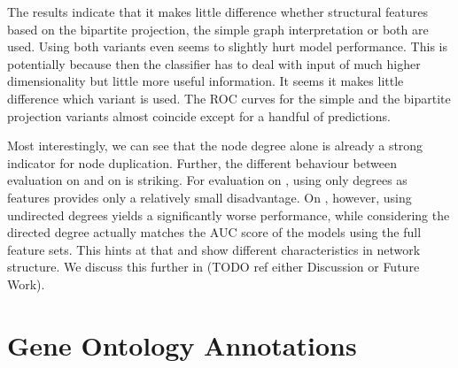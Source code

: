\documentclass[
	fontsize=10pt, %
	twoside=false, %
	secnumdepth=1, %
  toc=indentunnumbered %
]{kaobook}
\begin{document}
The results indicate that it makes little difference whether structural features
based on the bipartite projection, the simple graph interpretation or both are
used. Using both variants even seems to slightly hurt model performance. This is
potentially because then the classifier has to deal with input of much higher
dimensionality but little more useful information.
%
It seems it makes little difference which variant is used. The ROC curves for the simple
and the bipartite projection variants almost coincide except for a handful of
predictions.

Most interestingly, we can see that the node degree alone is already a strong
indicator for node duplication. Further, the different behaviour between
evaluation on \PDMap and on \ReconMap{} is striking. 
For evaluation on \PDMap, using only degrees as
features provides only a relatively small disadvantage. On \ReconMap{}, however,
using undirected degrees yields a significantly worse performance, while
considering the directed degree actually matches the AUC score of the models
using the full feature sets. This hints at that \PDMap and \ReconMap{} show
different characteristics in network structure. We discuss this further in (TODO
ref either Discussion or Future Work).


\section{Gene Ontology Annotations}
\label{sec:gene-ontology-annotations}




\end{document}
